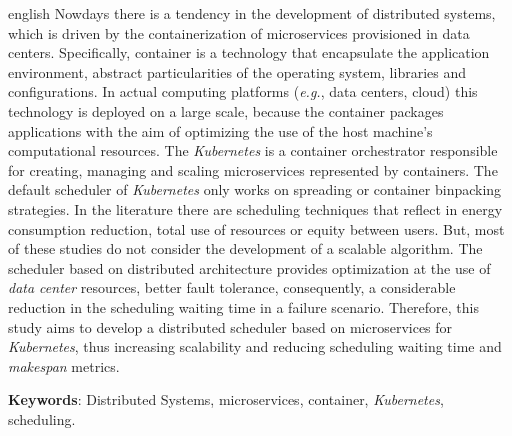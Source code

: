 \begin{resumo}[Abstract]
 \begin{otherlanguage*}{english}
   Nowdays there is a tendency in the development of distributed systems, which is driven by the containerization of microservices provisioned in data centers. Specifically, container is a technology that encapsulate the application environment, abstract particularities of the operating system, libraries and configurations. In actual computing platforms (\textit{e.g.}, data centers, cloud) this technology is deployed on a large scale, because the container packages applications with the aim of optimizing the use of the host machine's computational resources. The \textit{Kubernetes} is a container orchestrator responsible for creating, managing and scaling microservices represented by containers. The default scheduler of \textit{Kubernetes} only works on spreading or container binpacking strategies. In the literature there are scheduling techniques that reflect in energy consumption reduction, total use of resources or equity between users. But, most of these studies do not consider the development of a scalable algorithm. The scheduler based on distributed architecture provides optimization at the use of \textit{data center} resources, better fault tolerance, consequently, a considerable reduction in the scheduling waiting time in a failure scenario. Therefore, this study aims to develop a distributed scheduler based on microservices for \textit{Kubernetes}, thus increasing scalability and reducing scheduling waiting time and \textit{makespan} metrics.
   \vspace{\onelineskip}
 
   \noindent 
   \textbf{Keywords}: Distributed Systems, microservices, container, \textit{Kubernetes}, scheduling.
 \end{otherlanguage*}
\end{resumo}
